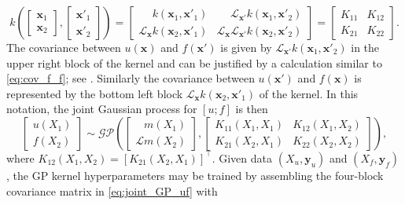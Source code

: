\begin{equation}\label{eq:joint_covariance}
k
\left(
\begin{bmatrix} 
\mathbf{x}_1 \\ 
\mathbf{x}_2 
\end{bmatrix}
,
\begin{bmatrix} 
\mathbf{x}'_1 \\ 
\mathbf{x}'_2 
\end{bmatrix}
\right)
=
\begin{bmatrix}
\phantom{\mathcal{L}_{\mathbf{x}}} k(\mathbf{x}_1,\mathbf{x}'_1) & 
\phantom{\mathcal{L}_{\mathbf{x}}}\mathcal{L}_{\mathbf{x}'}  k(\mathbf{x}_1,\mathbf{x}'_2)\\ 
\mathcal{L}_{\mathbf{x}}   k (\mathbf{x}_2,\mathbf{x}'_1) 
& \mathcal{L}_{\mathbf{x}} \mathcal{L}_{\mathbf{x'}} k(\mathbf{x}_2,\mathbf{x}'_2)
\end{bmatrix}
=
\begin{bmatrix}
K_{11} & 
K_{12} \\ 
K_{21} &
K_{22} 
\end{bmatrix}.
\end{equation}
The covariance between $u(\mathbf{x})$ and $f(\mathbf{x'})$ is given by $\mathcal{L}_{\mathbf{x}'}  k(\mathbf{x}_1,\mathbf{x}'_2)$ in the upper right block of the kernel and can be justified by a calculation similar to \eqref{eq:cov_f_f}; see . Similarly the covariance between $u(\mathbf{x}')$ and $f(\mathbf{x})$ is represented by the bottom left block $\mathcal{L}_{\mathbf{x}} k(\mathbf{x}_2,\mathbf{x}'_1)$ of the kernel. 
In this notation, the joint Gaussian process for $[u; f]$
is then
\begin{equation}\label{eq:joint_GP_uf}
\begin{bmatrix}
u({X}_1) \\ 
f({X}_2)
\end{bmatrix}
\sim \mathcal{GP}\left( 
\begin{bmatrix}
\phantom{\mathcal{L}}
m({X}_1) \\
\mathcal{L}
m({X}_2)
\end{bmatrix},
\begin{bmatrix}
K_{11}(X_1,X_1) & 
K_{12}(X_1,X_2) \\ 
K_{21}(X_2,X_1) &
K_{22}(X_2,X_2)
\end{bmatrix}
\right),
\end{equation}
where $K_{12}(X_1,X_2) = \left[K_{21}(X_2,X_1)\right]^\top$.
Given data $({X}_u,\mathbf{y}_u)$ and $({X}_f,\mathbf{y}_f)$, the GP kernel hyperparameters 
may be trained by assembling the four-block covariance matrix in \eqref{eq:joint_GP_uf} with 
